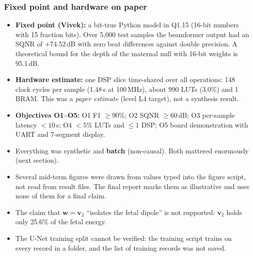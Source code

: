 \documentclass[11pt]{article}
\begin{document}
\begin{tried}
\end{tried}

\subsubsection{Fixed point and hardware on paper}
\begin{itemize}
  \item \textbf{Fixed point (Vivek):} a bit-true Python model in Q1.15 (16-bit numbers with 15 fraction bits). Over 5,000 test samples the beamformer output had an SQNR of $+74.52$\,dB with zero beat differences against double precision. A theoretical bound for the depth of the maternal null with 16-bit weights is 95.1\,dB.
  \item \textbf{Hardware estimate:} one DSP slice time-shared over all operations: 148 clock cycles per sample (1.48\,\textmu s at 100\,MHz), about 990 LUTs (3.0\%) and 1 BRAM. This was a \emph{paper estimate} (level L4 target), not a synthesis result.
  \item \textbf{Objectives O1--O5:} O1 F1 $\ge 90\%$; O2 SQNR $\ge 60$\,dB; O3 per-sample latency $<10$\,\textmu s; O4 $<5\%$ LUTs and $\le 1$ DSP; O5 board demonstration with UART and 7-segment display.
\end{itemize}

\begin{warn}
\begin{itemize}
  \item Everything was synthetic and \textbf{batch} (non-causal). Both mattered enormously (next section).
  \item Several mid-term figures were drawn from values typed into the figure script, not read from result files. The final report marks them as illustrative and uses none of them for a final claim.
  \item The claim that $\mathbf{w} = \mathbf{v}_2$ ``isolates the fetal dipole'' is not supported: $\mathbf{v}_2$ holds only 25.6\% of the fetal energy.
  \item The U-Net training split cannot be verified: the training script trains on every record in a folder, and the list of training records was not saved.
\end{itemize}
\end{warn}
\end{document}
